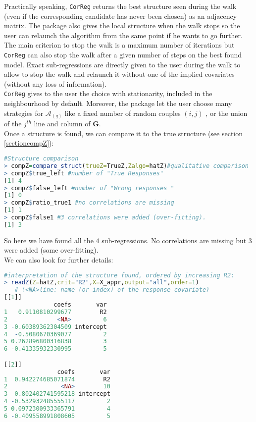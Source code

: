\documentclass[12pt,a4paper]{report}
\begin{document}
\begin{appendices}
Practically speaking, {\tt CorReg} returns the best structure seen during the walk (even if the corresponding candidate has never been chosen) as an adjacency matrix. The package also gives the local structure when the walk stops so the user can relaunch the algorithm from the same point if he wants to go further.\\
The main criterion to stop the walk is a maximum number of iterations but {\tt CorReg} can also stop the walk after a given number of steps on the best found model. Exact sub-regressions are directly given to the user during the walk to allow to stop the walk and relaunch it without one of the implied covariates (without any loss of information).	\\
{\tt CorReg} gives to the user the choice with stationarity,  included in the neighbourhood by default. Moreover, the package let the user choose many strategies for $\mathcal{A}_{(q)}$ like a fixed number of random couples $(i,j)$ , or the union of the $j^{th}$ line and column of $\boldsymbol{G}$.\\

Once a structure is found, we can compare it to the true structure (see section \ref{sectioncompZ}):
\begin{lstlisting}[language=R]
  #Structure comparison
> compZ=compare_struct(trueZ=TrueZ,Zalgo=hatZ)#qualitative comparison
> compZ$true_left #number of "True Responses"
[1] 4
> compZ$false_left #number of "Wrong responses "
[1] 0
> compZ$ratio_true1 #no correlations are missing
[1] 1	
> compZ$false1 #3 correlations were added (over-fitting).
[1] 3
\end{lstlisting}
So here we have found all the $4$ sub-regressions. 
No correlations are missing but $3$ were added (some over-fitting).\\
We can also look for further details:
\begin{lstlisting}[language=R]
#interpretation of the structure found, ordered by increasing R2:
> readZ(Z=hatZ,crit="R2",X=X_appr,output="all",order=1)
   # (<NA>line: name (or index) of the response covariate)
[[1]]
              coefs       var
1   0.9110810299677        R2
2              <NA>         6
3 -0.60389362304509 intercept
4  -0.5080670369077         2
5 0.262896800316838         3
6 -0.41335932330995         5

[[2]]
               coefs       var
1  0.942274685071874        R2
2               <NA>        10
3  0.802402741595218 intercept
4 -0.532932485555117         2
5 0.0972300933365791         4
6 -0.409558991808605         5


\end{lstlisting}
\end{appendices}
\end{document}
